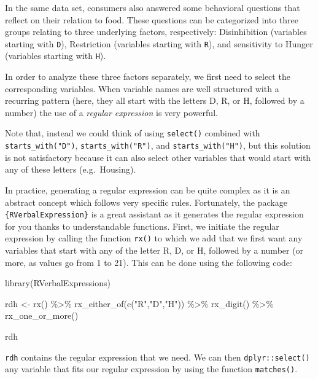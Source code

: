 \documentclass[
]{book}
\newenvironment{Shaded}{\begin{snugshade}}{\end{snugshade}}
\newcommand{\FunctionTok}[1]{\textcolor[rgb]{0.00,0.00,0.00}{#1}}
\newcommand{\NormalTok}[1]{#1}
\newcommand{\OtherTok}[1]{\textcolor[rgb]{0.56,0.35,0.01}{#1}}
\newcommand{\SpecialCharTok}[1]{\textcolor[rgb]{0.00,0.00,0.00}{#1}}
\newcommand{\StringTok}[1]{\textcolor[rgb]{0.31,0.60,0.02}{#1}}
\begin{document}
In the same data set, consumers also answered some behavioral questions that reflect on their relation to food. These questions can be categorized into three groups relating to three underlying factors, respectively: Disinhibition (variables starting with \texttt{D}), Restriction (variables starting with \texttt{R}), and sensitivity to Hunger (variables starting with \texttt{H}).

In order to analyze these three factors separately, we first need to select the corresponding variables. When variable names are well structured with a recurring pattern (here, they all start with the letters D, R, or H, followed by a number) the use of a \emph{regular expression} is very powerful.

Note that, instead we could think of using \texttt{select()} combined with \texttt{starts\_with("D")}, \texttt{starts\_with("R")}, and \texttt{starts\_with("H")}, but this solution is not satisfactory because it can also select other variables that would start with any of these letters (e.g.~Housing).

In practice, generating a regular expression can be quite complex as it is an abstract concept which follows very specific rules. Fortunately, the package \texttt{\{RVerbalExpression\}} is a great assistant as it generates the regular expression for you thanks to understandable functions. First, we initiate the regular expression by calling the function \texttt{rx()} to which we add that we first want any variables that start with any of the letter R, D, or H, followed by a number (or more, as values go from 1 to 21). This can be done using the following code:

\begin{Shaded}
\begin{Highlighting}[]
\FunctionTok{library}\NormalTok{(RVerbalExpressions)}

\NormalTok{rdh }\OtherTok{\textless{}{-}} \FunctionTok{rx}\NormalTok{() }\SpecialCharTok{\%\textgreater{}\%} 
  \FunctionTok{rx\_either\_of}\NormalTok{(}\FunctionTok{c}\NormalTok{(}\StringTok{"R"}\NormalTok{,}\StringTok{"D"}\NormalTok{,}\StringTok{"H"}\NormalTok{)) }\SpecialCharTok{\%\textgreater{}\%} 
  \FunctionTok{rx\_digit}\NormalTok{() }\SpecialCharTok{\%\textgreater{}\%} 
  \FunctionTok{rx\_one\_or\_more}\NormalTok{()}

\NormalTok{rdh}
\end{Highlighting}
\end{Shaded}

\texttt{rdh} contains the regular expression that we need. We can then \texttt{dplyr::select()} any variable that fits our regular expression by using the function \texttt{matches()}.
\end{document}
